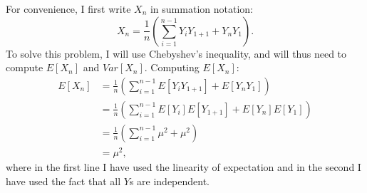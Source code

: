  \begin{problem}{15}  For convenience, I first write $X_n$ in summation notation:
 \begin{equation*}
 X_n = \frac{1}{n} \left (\sum_{i=1}^{n-1}Y_i Y_{1+1}+Y_nY_1 \right ).  
 \end{equation*}
 To solve this problem, I will use Chebyshev's inequality, and will thus need to compute $E[X_n]$ and $Var[X_n]$.  Computing $E[X_n]$:
 \begin{align*}
 E[X_n] & = \frac{1}{n} \left(\sum_{i=1}^{n-1}E[Y_i Y_{1+1}]+E[Y_nY_1]  \right) \\
 & = \frac{1}{n} \left(\sum_{i=1}^{n-1}E[Y_i] E[Y_{1+1}]+E[Y_n]E[Y_1]  \right) \\
  & = \frac{1}{n} \left(\sum_{i=1}^{n-1}\mu^2+\mu^2 \right) \\
  & = \mu^2,
 \end{align*}
 where in the first line I have used the linearity of expectation and in the second I have used the fact that all $Y$s are independent.  


\end{problem}
